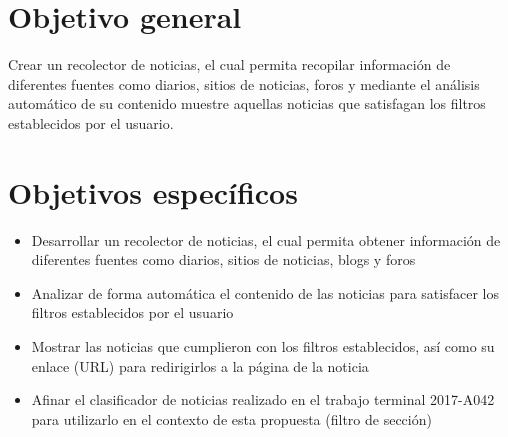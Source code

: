 \section{Objetivo general}

  Crear un recolector de noticias, el cual permita recopilar información de diferentes fuentes como diarios, sitios de noticias, foros y mediante el 
  análisis automático de su contenido muestre aquellas noticias que satisfagan los filtros establecidos por el usuario.
  

\section{Objetivos específicos}
\begin{itemize}
  \item Desarrollar un recolector de noticias, el cual permita obtener información de diferentes fuentes como diarios, sitios de noticias, blogs y foros
  \item Analizar de forma automática el contenido de las noticias para satisfacer los filtros establecidos por el usuario
  \item Mostrar las noticias que cumplieron con los filtros establecidos, así como su enlace (URL) para redirigirlos a la página de la noticia
  \item Afinar el clasificador de noticias realizado en el trabajo terminal 2017-A042 para utilizarlo en el contexto de esta propuesta (filtro de sección) 
\end{itemize}